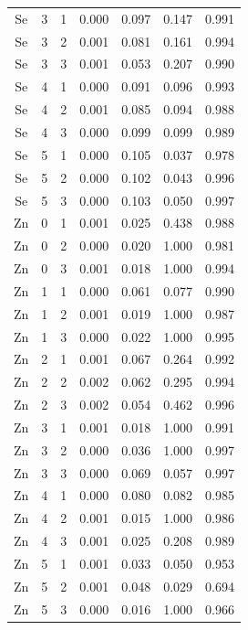 \documentclass[ms, hidelinks]{uncgdissertationexp3}
\theoremstyle{plain}
\theoremstyle{definition}
\theoremstyle{remark}
\begin{document}
\begin{longtable}{ccccccc}
  Se & 3 & 1 & 0.000 & 0.097 & 0.147 & 0.991\\
  \rowcolor{gray!6}  Se & 3 & 2 & 0.001 & 0.081 & 0.161 & 0.994\\
  Se & 3 & 3 & 0.001 & 0.053 & 0.207 & 0.990\\
  \rowcolor{gray!6}  Se & 4 & 1 & 0.000 & 0.091 & 0.096 & 0.993\\
  Se & 4 & 2 & 0.001 & 0.085 & 0.094 & 0.988\\
  \rowcolor{gray!6}  Se & 4 & 3 & 0.000 & 0.099 & 0.099 & 0.989\\
  Se & 5 & 1 & 0.000 & 0.105 & 0.037 & 0.978\\
  \rowcolor{gray!6}  Se & 5 & 2 & 0.000 & 0.102 & 0.043 & 0.996\\
  Se & 5 & 3 & 0.000 & 0.103 & 0.050 & 0.997\\
  \rowcolor{gray!6}  Zn & 0 & 1 & 0.001 & 0.025 & 0.438 & 0.988\\
  Zn & 0 & 2 & 0.000 & 0.020 & 1.000 & 0.981\\
  \rowcolor{gray!6}  Zn & 0 & 3 & 0.001 & 0.018 & 1.000 & 0.994\\
  Zn & 1 & 1 & 0.000 & 0.061 & 0.077 & 0.990\\
  \rowcolor{gray!6}  Zn & 1 & 2 & 0.001 & 0.019 & 1.000 & 0.987\\
  Zn & 1 & 3 & 0.000 & 0.022 & 1.000 & 0.995\\
  \rowcolor{gray!6}  Zn & 2 & 1 & 0.001 & 0.067 & 0.264 & 0.992\\
  Zn & 2 & 2 & 0.002 & 0.062 & 0.295 & 0.994\\
  \rowcolor{gray!6}  Zn & 2 & 3 & 0.002 & 0.054 & 0.462 & 0.996\\
  Zn & 3 & 1 & 0.001 & 0.018 & 1.000 & 0.991\\
  \rowcolor{gray!6}  Zn & 3 & 2 & 0.000 & 0.036 & 1.000 & 0.997\\
  Zn & 3 & 3 & 0.000 & 0.069 & 0.057 & 0.997\\
  \rowcolor{gray!6}  Zn & 4 & 1 & 0.000 & 0.080 & 0.082 & 0.985\\
  Zn & 4 & 2 & 0.001 & 0.015 & 1.000 & 0.986\\
  \rowcolor{gray!6}  Zn & 4 & 3 & 0.001 & 0.025 & 0.208 & 0.989\\
  Zn & 5 & 1 & 0.001 & 0.033 & 0.050 & 0.953\\
  \rowcolor{gray!6}  Zn & 5 & 2 & 0.001 & 0.048 & 0.029 & 0.694\\
  Zn & 5 & 3 & 0.000 & 0.016 & 1.000 & 0.966\\*
\end{longtable}
    

\backmatter
\end{document}
